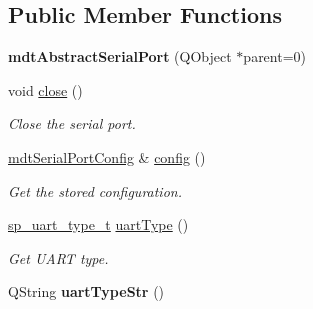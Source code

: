 \subsection*{Public Member Functions}
\begin{DoxyCompactItemize}
\item 
\hypertarget{classmdt_abstract_serial_port_ae379b6151edebc1518e81ec061e379db}{
{\bfseries mdtAbstractSerialPort} (QObject $\ast$parent=0)}
\label{classmdt_abstract_serial_port_ae379b6151edebc1518e81ec061e379db}

\item 
void \hyperlink{classmdt_abstract_serial_port_ae668910f98ad0e158dc6ebebf0c19805}{close} ()
\begin{DoxyCompactList}\small\item\em Close the serial port. \end{DoxyCompactList}\item 
\hypertarget{classmdt_abstract_serial_port_ae053b73fee897769641813df658c9ead}{
\hyperlink{classmdt_serial_port_config}{mdtSerialPortConfig} \& \hyperlink{classmdt_abstract_serial_port_ae053b73fee897769641813df658c9ead}{config} ()}
\label{classmdt_abstract_serial_port_ae053b73fee897769641813df658c9ead}

\begin{DoxyCompactList}\small\item\em Get the stored configuration. \end{DoxyCompactList}\item 
\hyperlink{classmdt_abstract_serial_port_a56b107c57fb0acb17cfcca262abe6a54}{sp\_\-uart\_\-type\_\-t} \hyperlink{classmdt_abstract_serial_port_a6b153155d9e110336d51ec48d2cee203}{uartType} ()
\begin{DoxyCompactList}\small\item\em Get UART type. \end{DoxyCompactList}\item 
\hypertarget{classmdt_abstract_serial_port_a669c9ce68455abd3cfdb98259996e701}{
QString {\bfseries uartTypeStr} ()}
\label{classmdt_abstract_serial_port_a669c9ce68455abd3cfdb98259996e701}


\end{DoxyCompactItemize}

